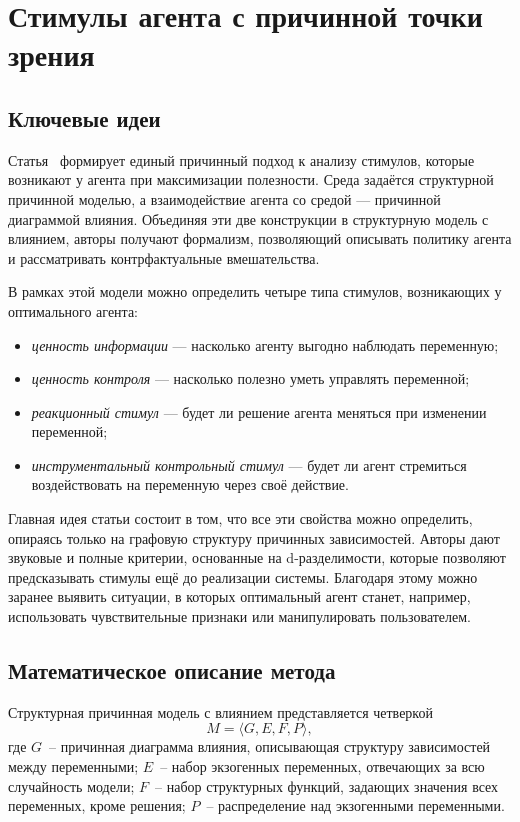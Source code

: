 \section{Стимулы агента с причинной точки зрения}

\subsection{Ключевые идеи}

Статья~\cite{everitt2021agentincentives} формирует единый причинный подход к анализу стимулов, которые возникают 
у агента при максимизации полезности. Среда задаётся структурной причинной моделью, 
а взаимодействие агента со средой — причинной диаграммой влияния. 
Объединяя эти две конструкции в структурную модель с влиянием, авторы получают 
формализм, позволяющий описывать политику агента и рассматривать контрфактуальные 
вмешательства.

В рамках этой модели можно определить четыре типа стимулов, возникающих у оптимального агента:

\begin{itemize}
    \item \emph{ценность информации} — насколько агенту выгодно наблюдать переменную;
    \item \emph{ценность контроля} — насколько полезно уметь управлять переменной;
    \item \emph{реакционный стимул} — будет ли решение агента меняться при изменении переменной;
    \item \emph{инструментальный контрольный стимул} — будет ли агент стремиться воздействовать на переменную через своё действие.
\end{itemize}

Главная идея статьи состоит в том, что все эти свойства можно определить, 
опираясь только на графовую структуру причинных зависимостей. Авторы дают 
звуковые и полные критерии, основанные на d-разделимости, которые позволяют 
предсказывать стимулы ещё до реализации системы. Благодаря этому можно заранее 
выявить ситуации, в которых оптимальный агент станет, например, использовать 
чувствительные признаки или манипулировать пользователем.

\subsection{Математическое описание метода}

Структурная причинная модель с влиянием представляется четверкой
\begin{equation}
    M = \langle G, E, F, P \rangle,
\end{equation}
где $G$~-- причинная диаграмма влияния, описывающая структуру зависимостей между переменными;  
$E$~-- набор экзогенных переменных, отвечающих за всю случайность модели;  
$F$~-- набор структурных функций, задающих значения всех переменных, кроме решения;  
$P$~-- распределение над экзогенными переменными.  

